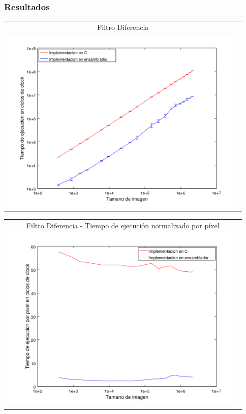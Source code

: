	\subsubsection{Resultados}
   	{\centering \begin{tabular}{c}
      {\small Filtro Diferencia} \\
      \includegraphics[width=12cm]{../exp/graficos/exp1-diff-c_vs_asm.png} \\
    \end{tabular}}

    {\centering \begin{tabular}{c}
      {\small Filtro Diferencia - Tiempo de ejecución normalizado por píxel} \\
      \includegraphics[width=12cm]{../exp/graficos/exp1-diff-tiempo_por_pixel.png} \\
    \end{tabular}}


